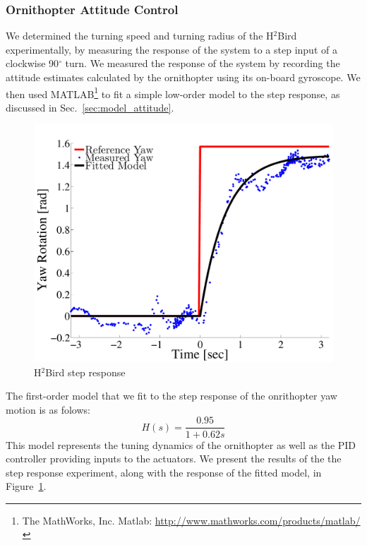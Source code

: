 \documentclass{aamas2013}
\begin{document}
\subsubsection{Ornithopter Attitude Control}
\label{sec:flight_control}
We determined the turning speed and turning radius of the H$^2$Bird 
experimentally, by measuring the response of the system to a step input of a 
clockwise 90$^{\circ}$ turn. We measured the response of the system by 
recording the attitude estimates calculated by the ornithopter using its 
on-board gyroscope. We then used MATLAB\footnote{The MathWorks, Inc. Matlab:
\href{http://www.mathworks.com/products/matlab/}
     {http://www.mathworks.com/products/matlab/}} 
to fit a simple low-order model to the step response, as discussed in 
Sec.~\ref{sec:model_attitude}.

\begin{figure}[tb]
\centering
\includegraphics[width=\linewidth]{figures/step_response_total.pdf}
\caption{H$^2$Bird step response}
\label{fig:step_response}
\end{figure}

The first-order model that we fit to the step response of the onrithopter 
yaw motion is as folows:
\begin{equation}
\label{eq:transfer_func}
H(s) = \frac{0.95}{1+0.62s}
\end{equation}
This model represents the tuning dynamics of the ornithopter as well as the
PID controller providing inputs to the actuators. We present the results of
the the step response experiment, along with the response of the fitted model,
in Figure~\ref{fig:step_response}.
\end{document}
